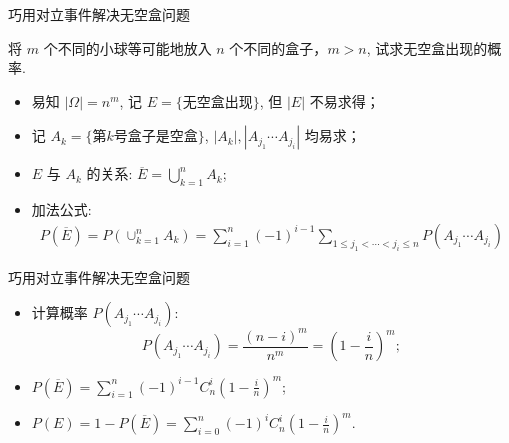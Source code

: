 \begin{frame}{巧用对立事件解决无空盒问题}
	\begin{exam}
		将 $m$ 个不同的小球等可能地放入 $n$ 个不同的盒子，$m>n$, 试求无空盒出现的概率.
	\end{exam}

	\vspace{0.4cm}
	\pause
	\begin{itemize}[<+-|alert@+>]
		\item 易知 $|\Omega|=n^m$, 记 $E=\{\mbox{无空盒出现}\}$, 但 $|E|$ 不易求得；
		\item 记 $A_k=\{\mbox{第} k\mbox{号盒子是空盒}\}$, $|A_k|, |A_{j_1}\cdots A_{j_i}|$ 均易求；
		\item $E$ 与 $A_k$ 的关系: \pause $\overline{E}=\bigcup\limits_{k=1}^{n} A_k$;
		\item 加法公式:
		      \begin{align*}
			      P(\overline{E})=P\left(\cup_{k=1}^{n}A_k\right)=\sum_{i=1}^n(-1)^{i-1}\sum_{1\leq j_1<\cdots<j_i\leq n}P(A_{j_1}\cdots A_{j_i})
		      \end{align*}
	\end{itemize}

\end{frame}
\begin{frame}{巧用对立事件解决无空盒问题}
	\begin{itemize}[<+-|alert@+>]
		\item 计算概率 $P (A_{j_1}\cdots A_{j_i})$: \pause
		      $$P(A_{j_1}\cdots A_{j_i})=\frac{(n-i)^m}{n^m}=\left(1-\frac{i}{n}\right)^m;$$
		\item $P(\overline{E})=\sum_{i=1}^n(-1)^{i-1}C_n^i\left(1-\frac{i}{n}\right)^m$;
		\item $	P(E)=1-P(\overline{E})=\sum_{i=0}^n(-1)^{i}C_n^i\left(1-\frac{i}{n}\right)^m.$
	\end{itemize}
\end{frame}


